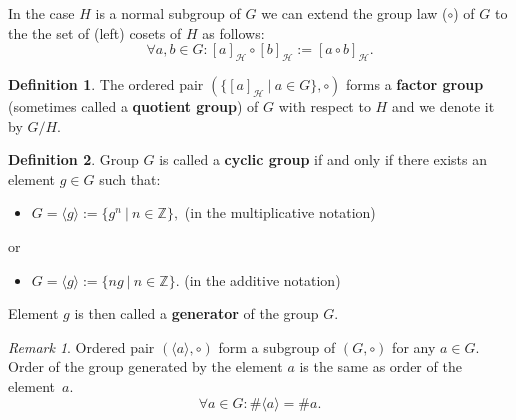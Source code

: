 \documentclass[thesis=M,english]{FITthesis}[2012/10/20]
\theoremstyle{remark}
\newtheorem*{RM}{Remark}
\theoremstyle{definition}
\newtheorem{DF}{Definition}[section]
\begin{document}
\noindent In the case $H$ is a normal subgroup of $G$ we can extend the group law ($\circ$) of $G$ to the the set of (left) cosets of $H$ as follows:
$$
\forall a,b \in G: [a]_{\mathcal{H}} \circ [b]_{\mathcal{H}} := [a \circ b]_{\mathcal{H}}.
$$
\begin{DF}
The ordered pair $(\{[a]_{\mathcal{H}}\ |\ a \in G\}, \circ)$ forms a \textbf{factor group} (sometimes called a \textbf{quotient group}) of $G$ with respect to $H$ and we denote it by $G/H$.
\end{DF}
\begin{DF}
Group $G$ is called a \textbf{cyclic group} if and only if there exists an element $g \in G$ such that:
\begin{itemize}
\item $G = \langle g \rangle := \{ g^n\ |\ n \in \mathbb{Z} \},$ \hfill (in the multiplicative notation) 
\end{itemize}
or
\begin{itemize}
\item $G = \langle g \rangle := \{ ng\ |\ n \in \mathbb{Z} \}.$ \hfill (in the additive notation)
\end{itemize}
\end{DF}
\noindent Element $g$ is then called a \textbf{generator} of the group $G$.
\begin{RM}
Ordered pair $(\langle a \rangle, \circ)$ form a subgroup of $(G, \circ)$ for any $a \in G$. Order of the group generated by the element $a$ is the same as order of the element~$a$. 
$$
\forall a \in G: \#\langle a \rangle = \#a.
$$
\end{RM}
\end{document}
